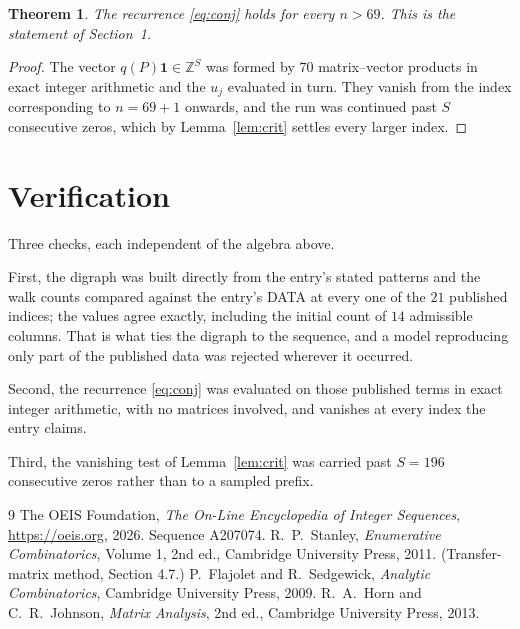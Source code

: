 \documentclass[11pt,a4paper]{article}
\theoremstyle{plain}
\newtheorem{theorem}{Theorem}
\theoremstyle{definition}
\begin{document}
\begin{theorem}
The recurrence \eqref{eq:conj} holds for every $n>69$. This is the statement of
Section~1.
\end{theorem}

\begin{proof}
The vector $q(P)\mathbf{1}\in\mathbb{Z}^{S}$ was formed by $70$ matrix--vector
products in exact integer arithmetic and the $u_j$ evaluated in turn. They vanish from the
index corresponding to $n=69+1$ onwards, and the run was continued past $S$ consecutive
zeros, which by Lemma~\ref{lem:crit} settles every larger index.
\end{proof}

\section{Verification}

Three checks, each independent of the algebra above.

First, the digraph was built directly from the entry's stated patterns and the walk counts
compared against the entry's DATA at every one of the $21$ published indices; the
values agree exactly, including the initial count of $14$ admissible columns. That is
what ties the digraph to the sequence, and a model reproducing only part of the published
data was rejected wherever it occurred.

Second, the recurrence \eqref{eq:conj} was evaluated on those published terms in exact
integer arithmetic, with no matrices involved, and vanishes at every index the entry claims.

Third, the vanishing test of Lemma~\ref{lem:crit} was carried past $S=196$ consecutive
zeros rather than to a sampled prefix.

\begin{thebibliography}{9}
 The OEIS Foundation, \emph{The On-Line Encyclopedia of Integer
Sequences}, \url{https://oeis.org}, 2026. Sequence A207074.
 R.~P.~Stanley, \emph{Enumerative Combinatorics}, Volume 1, 2nd ed.,
Cambridge University Press, 2011. (Transfer-matrix method, Section 4.7.)
 P.~Flajolet and R.~Sedgewick, \emph{Analytic Combinatorics}, Cambridge
University Press, 2009.
 R.~A.~Horn and C.~R.~Johnson, \emph{Matrix Analysis}, 2nd ed., Cambridge
University Press, 2013.
\end{thebibliography}
\end{document}
